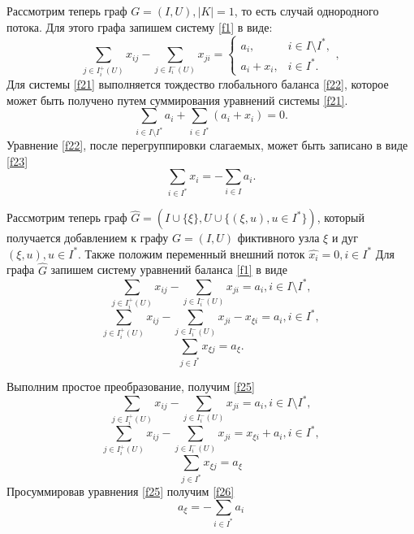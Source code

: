 \documentclass[14pt]{extarticle}%
\begin{document}
Рассмотрим теперь граф $G=(I,U), |K|=1$, то есть случай однородного потока. Для этого графа запишем систему \eqref{f1} в виде:
\begin{equation}\label{f21}
 \sum_{j\in I^+_i(U)} x_{ij}-\sum_{j\in I^-_i(U)}x_{ji}=\left\{\begin{matrix}
a_i, & i\in I\setminus I^*,\\ 
a_i+x_i, & i\in I^*.
\end{matrix}\right.,
\end{equation}
Для системы \eqref{f21} выполняется тождество глобального баланса \eqref{f22}, которое может быть получено путем суммирования уравнений системы \eqref{f21}.
\begin{equation}\label{f22}
\sum_{i\in I\setminus I^*} a_i +\sum_{i\in I^*} (a_i+x_i)=0.
\end{equation}
Уравнение \eqref{f22}, после перегруппировки слагаемых, может быть записано в виде \eqref{f23}
\begin{equation}\label{f23}
\sum_{i\in I^*}x_i=-\sum_{i\in I}a_i.
\end{equation}

Рассмотрим теперь граф $\widehat{G}=(I\cup\{\xi\}, U\cup\{(\xi,u),u\in I^*\})$, который получается добавлением к графу $G=(I,U)$ фиктивного узла $\xi$ и дуг $(\xi,u),u\in I^*$. Также положим переменный внешний поток $\widehat{x_i}=0, i\in I^*$  Для графа $\widehat{G}$ запишем систему уравнений баланса \eqref{f1} в виде
\begin{equation*}
\sum_{j\in I^+_i(U)} x_{ij}-\sum_{j\in I^-_i(U)}x_{ji}=a_i,  i\in I\setminus I^*, 
\end{equation*}
\begin{equation}\label{f24} 
\sum_{j\in I^+_i(U)} x_{ij}-\sum_{j\in I^-_i(U)}x_{ji} -x_{\xi i}=a_i,  i\in I^*,
\end{equation}
\begin{equation*}
\sum_{j\in I^*} x_{\xi j}=a_\xi.
\end{equation*}


Выполним простое преобразование, получим \eqref{f25}
\begin{equation*}
\sum_{j\in I^+_i(U)} x_{ij}-\sum_{j\in I^-_i(U)}x_{ji}=a_i, i\in I\setminus I^*,
\end{equation*}
\begin{equation}\label{f25} 
\sum_{j\in I^+_i(U)} x_{ij}-\sum_{j\in I^-_i(U)}x_{ji} =x_{\xi i}+a_i, i\in I^*,
\end{equation}
\begin{equation*}
\sum_{j\in I^*} x_{\xi j}=a_\xi 
\end{equation*}
Просуммировав уравнения \eqref{f25} получим \eqref{f26}
\begin{equation}\label{f26}
a_{\xi}=-\sum_{i \in I^*} a_i
\end{equation}
\end{document}
